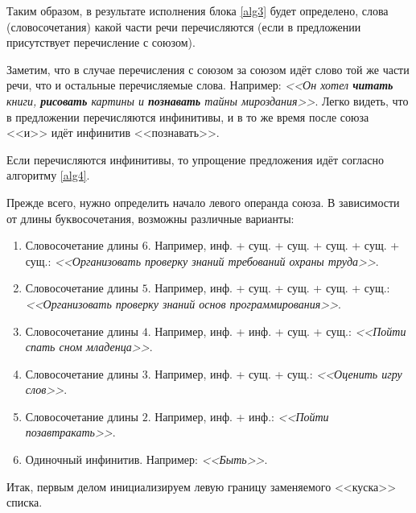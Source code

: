 \documentclass[main]{subfiles}
\begin{document}
Таким образом, в результате исполнения блока \ref{alg3} будет определено, слова (словосочетания) какой части речи перечисляются (если в предложении присутствует перечисление с союзом).

Заметим, что в случае перечисления с союзом за союзом идёт слово той же части речи, что и остальные перечисляемые слова. Например: \textit{<<Он хотел \textbf{читать} книги, \textbf{рисовать} картины и \textbf{познавать} тайны мироздания>>}. Легко видеть, что в предложении перечисляются инфинитивы, и в то же время после союза <<и>> идёт инфинитив <<познавать>>.

Если перечисляются инфинитивы, то упрощение предложения идёт согласно алгоритму \ref{alg4}.

Прежде всего, нужно определить начало левого операнда союза. В зависимости от длины буквосочетания, возможны различные варианты:
\begin{enumerate}
	\item Словосочетание длины $6$. Например, инф. + сущ. + сущ. + сущ. + сущ. + сущ.: \textit{<<Организовать проверку знаний требований охраны труда>>}.
	\item Словосочетание длины $5$. Например, инф. + сущ. + сущ. + сущ. + сущ.: \textit{<<Организовать проверку знаний основ программирования>>}.
	\item Словосочетание длины $4$. Например, инф. + инф. + сущ. + сущ.: \textit{<<Пойти спать сном младенца>>}.
	\item Словосочетание длины $3$. Например, инф. + сущ. + сущ.: \textit{<<Оценить игру слов>>}.
	\item Словосочетание длины $2$. Например, инф. + инф.: \textit{<<Пойти позавтракать>>}.
	\item Одиночный инфинитив. Например: \textit{<<Быть>>}.
\end{enumerate}
Итак, первым делом инициализируем левую границу заменяемого <<куска>> списка.
\end{document}
